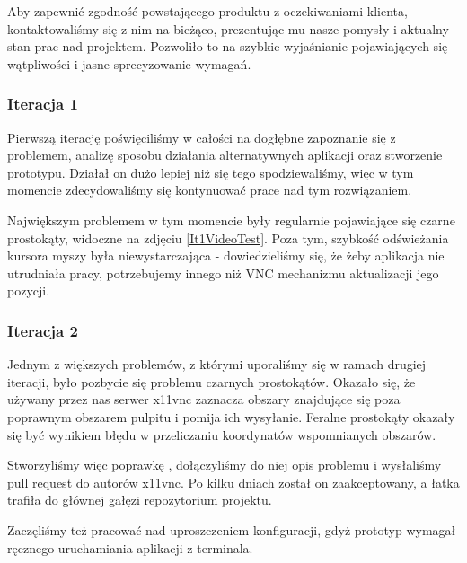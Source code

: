     Aby zapewnić zgodność powstającego produktu z oczekiwaniami klienta, kontaktowaliśmy się z nim na bieżąco, prezentując mu nasze pomysły i aktualny stan prac nad projektem. Pozwoliło to na szybkie wyjaśnianie pojawiających się wątpliwości i jasne sprecyzowanie wymagań.

    \subsubsection{Iteracja 1}

      Pierwszą iterację poświęciliśmy w całości na dogłębne zapoznanie się z problemem, analizę sposobu działania alternatywnych aplikacji oraz stworzenie prototypu. Działał on dużo lepiej niż się tego spodziewaliśmy, więc w tym momencie zdecydowaliśmy się kontynuować prace nad tym rozwiązaniem.

      Największym problemem w tym momencie były regularnie pojawiające się czarne prostokąty, widoczne na zdjęciu \ref{It1VideoTest}. Poza tym, szybkość odświeżania kursora myszy była niewystarczająca - dowiedzieliśmy się, że żeby aplikacja nie utrudniała pracy, potrzebujemy innego niż VNC mechanizmu aktualizacji jego pozycji.


    \subsubsection{Iteracja 2}

      \label{sec:x11vncBug}
      Jednym z większych problemów, z którymi uporaliśmy się w ramach drugiej iteracji, było pozbycie się problemu czarnych prostokątów. Okazało się, że używany przez nas serwer x11vnc zaznacza obszary znajdujące się poza poprawnym obszarem pulpitu i pomija ich wysyłanie. Feralne prostokąty okazały się być wynikiem błędu w przeliczaniu koordynatów wspomnianych obszarów.

      Stworzyliśmy więc poprawkę \cite{x11vncPatch}, dołączyliśmy do niej opis problemu i wysłaliśmy pull request \cite{x11vncPullRequest} do autorów x11vnc. Po kilku dniach został on zaakceptowany, a łatka trafiła do głównej gałęzi repozytorium projektu.


      Zaczęliśmy też pracować nad uproszczeniem konfiguracji, gdyż prototyp wymagał ręcznego uruchamiania aplikacji z terminala.

